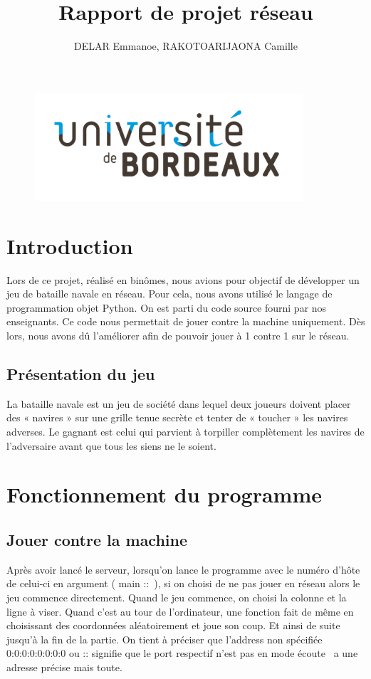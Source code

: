 \documentclass{article}
\title{Rapport de projet r\'eseau}
\author{DELAR Emmanoe, RAKOTOARIJAONA Camille}
\begin{document}
\maketitle
\begin{figure}[!b]
		\centering
		\includegraphics[height=4cm]{logo.jpg}
	\end{figure}
\newpage
\tableofcontents

\newpage
\section{Introduction}
Lors de ce projet, r\'ealis\'e en bin\^omes, nous avions pour objectif de d\'evelopper un jeu de bataille navale en r\'eseau. Pour cela, nous avons utilis\'e le langage de programmation objet Python.
On est parti du code source fourni par nos enseignants. Ce code nous permettait de jouer contre la machine uniquement. D\`es lors, nous avons d\^u l'am\'eliorer afin de pouvoir jouer \`a 1 contre 1 sur le r\'eseau.

\subsection{Pr\'esentation du jeu}
	 La bataille navale est un jeu de soci\'et\'e dans lequel deux joueurs doivent placer des « navires » sur une grille tenue secrète et tenter de « toucher » les navires adverses. Le gagnant est celui qui parvient \`a torpiller compl\`etement les navires de l'adversaire avant que tous les siens ne le soient.


\section{Fonctionnement du programme}
	 \subsection{Jouer contre la machine}
	 Apr\`es avoir lanc\'e le serveur, lorsqu'on lance le programme avec le num\'ero d\textquoteright h\^ote de celui-ci en argument ( \guillemotleft main ::\guillemotright \ ), si on choisi de ne pas jouer en r\'eseau alors le jeu commence directement. Quand le jeu commence, on choisi la colonne et la ligne \`a viser. Quand c'est au tour de l'ordinateur, une fonction fait de m\^eme en choisissant des coordonn\'ees al\'eatoirement et joue son coup. Et ainsi de suite jusqu'\`a la fin de la partie. 
	 \newline On tient \`a pr\'eciser que l'address non sp\'ecifi\'ee 0:0:0:0:0:0:0:0 ou :: signifie que le port respectif n'est pas en mode \guillemotleft \'ecoute \guillemotright \ a une adresse pr\'ecise mais toute. 
\end{document}
